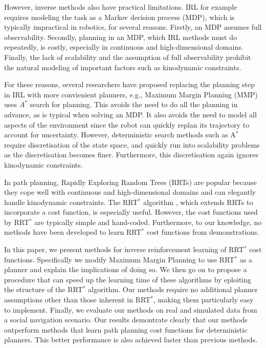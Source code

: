 \documentclass{article}  %
\begin{document}
However, inverse methods also have practical limitations. IRL for example requires modeling the task as a Markov decision process (MDP), which is typically impractical in robotics, for several reasons.  Firstly, an MDP assumes full observability. Secondly, planning in an MDP, which IRL methods must do repeatedly, is costly, especially in continuous and high-dimensional domains. Finally, the lack of scalability and the assumption of full observability prohibit the natural modeling of important factors such as kinodynamic constraints. 

For these reasons, several researchers have proposed replacing the planning step in IRL with more convienient planners, e.g., Maximum Margin Planning (MMP) \cite{ratliff2006maximum} uses $A^*$ search for planning. This avoids the need to do all the planning in advance, as is typical when solving an MDP. It also avoids the need to model all aspects of the environment since the robot can quickly replan its trajectory to account for uncertainty. However, deterministic search methods such as A$^*$ require discretisation of the state space, and quickly run into scalability problems as the discretisation becomes finer. Furthermore, this discretisation again ignores kinodynamic constraints.

In path planning, Rapidly Exploring Random Trees (RRTs) \cite{lavalle1998rapidly} are popular because they cope well with continuous and high-dimensional domains and can elegantly handle kinodynamic constraints. The RRT$^*$ algorithm \cite{karaman2011sampling}, which extends RRTs to incorporate a cost function, is especially useful. However, the cost functions used by RRT$^*$ are typically simple and hand-coded.  Furthermore, to our knowledge, no methods have been developed to learn RRT$^*$ cost functions from demonstrations.

In this paper, we present methods for inverse reinforcement learning of RRT$^*$ cost functions. Specifically we modify Maximum Margin Planning to use RRT$^*$ as a planner and explain the implications of doing so. We then go on to propose a procedure that can speed up the learning time of these algorithms by eploiting the structure of the RRT$^*$ algorithm. Our methods require no additional planner assumptions other than those inherent in RRT$^*$, making them particularly easy to implement. Finally, we evaluate our methods on real and simulated data from a social navigation scenario. Our results demontrate clearly that our methods outperform methods that learn path planning cost functions for deterministic planners. This better performance is also achieved faster than previous methods. 
\end{document}
